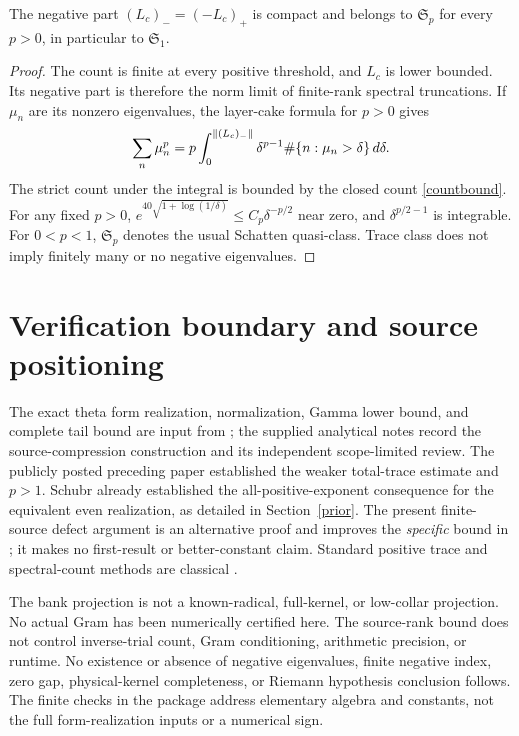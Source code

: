 \documentclass[11pt]{article}
\begin{document}
\begin{corollary}\label{schatten}
The negative part $(L_c)_-=(-L_c)_+$ is compact and belongs to $\mathfrak S_p$ for every $p>0$, in particular to $\mathfrak S_1$.
\end{corollary}
\begin{proof}
The count is finite at every positive threshold, and $L_c$ is lower bounded. Its negative part is therefore the norm limit of finite-rank spectral truncations. If $\mu_n$ are its nonzero eigenvalues, the layer-cake formula for $p>0$ gives
\[\sum_n\mu_n^p=p\int_0^{\lVert(L_c)_-\rVert}\delta^{p-1}\#\{n:\mu_n>\delta\}\,d\delta.
\]
The strict count under the integral is bounded by the closed count \eqref{countbound}. For any fixed $p>0$, $e^{40\sqrt{1+\log(1/\delta)}}\le C_p\delta^{-p/2}$ near zero, and $\delta^{p/2-1}$ is integrable. For $0<p<1$, $\mathfrak S_p$ denotes the usual Schatten quasi-class. Trace class does not imply finitely many or no negative eigenvalues.
\end{proof}

\section{Verification boundary and source positioning}\label{scope}
The exact theta form realization, normalization, Gamma lower bound, and complete tail bound are input from \cite{unified,previous}; the supplied analytical notes \cite{compression,audit,domainaudit} record the source-compression construction and its independent scope-limited review. The publicly posted preceding paper \cite{previous} established the weaker total-trace estimate and $p>1$. Schubr \cite{schubr} already established the all-positive-exponent consequence for the equivalent even realization, as detailed in Section~\ref{prior}. The present finite-source defect argument is an alternative proof and improves the \emph{specific} bound in \cite{previous}; it makes no first-result or better-constant claim. Standard positive trace and spectral-count methods are classical \cite{simon}.

The bank projection is not a known-radical, full-kernel, or low-collar projection. No actual Gram has been numerically certified here. The source-rank bound does not control inverse-trial count, Gram conditioning, arithmetic precision, or runtime. No existence or absence of negative eigenvalues, finite negative index, zero gap, physical-kernel completeness, or Riemann hypothesis conclusion follows. The finite checks in the package address elementary algebra and constants, not the full form-realization inputs or a numerical sign.
\end{document}
